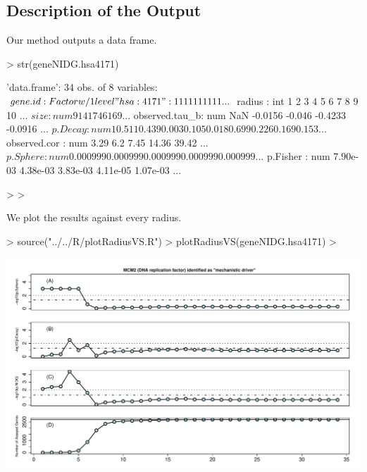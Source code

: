\documentclass[11pt]{article}
\begin{document}
\subsection*{Description of the Output} %



Our method outputs a data frame. 


\begin{Schunk}
\begin{Sinput}
> str(geneNIDG.hsa4171)
\end{Sinput}
\begin{Soutput}
'data.frame':	34 obs. of  8 variables:
 $ gene.id       : Factor w/ 1 level "hsa:4171": 1 1 1 1 1 1 1 1 1 1 ...
 $ radius        : int  1 2 3 4 5 6 7 8 9 10 ...
 $ size          : num  9 14 17 46 169 ...
 $ observed.tau_b: num  NaN -0.0156 -0.046 -0.4233 -0.0916 ...
 $ p.Decay       : num  1 0.511 0.439 0.003 0.105 0.018 0.699 0.226 0.169 0.153 ...
 $ observed.cor  : num  3.29 6.2 7.45 14.36 39.42 ...
 $ p.Sphere      : num  0.000999 0.000999 0.000999 0.000999 0.000999 ...
 $ p.Fisher      : num  7.90e-03 4.38e-03 3.83e-03 4.11e-05 1.07e-03 ...
\end{Soutput}
\begin{Sinput}
> 
> 
\end{Sinput}
\end{Schunk}


We plot the results against every radius.

\begin{Schunk}
\begin{Sinput}
> source("../../R/plotRadiusVS.R")
> plotRadiusVS(geneNIDG.hsa4171)
> 
\end{Sinput}
\end{Schunk}
\includegraphics{vignette-main-010}
\end{document}
